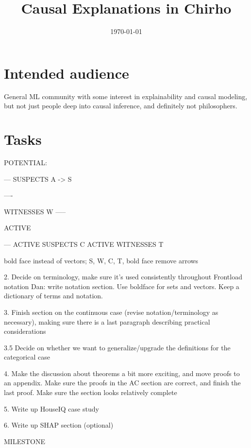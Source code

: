 \documentclass{article}
\title{Causal Explanations in Chirho}
\author{}
\date{\today}
\begin{document}
\maketitle



\section{Intended audience}

General ML community with some interest in explainability and causal modeling, but not just people deep into causal inference, and definitely not philosophers.


\section{Tasks}


POTENTIAL:

    ---
    SUSPECTS  A  -> S 
    
    ----
    
    WITNESSES  W
    -----

ACTIVE


    ---
    ACTIVE SUSPECTS    C
    ACTIVE WITNESSES    T


bold face instead of vectors; S, W, C, T, bold face
remove arrows




2. Decide on terminology, make sure it's used consistently throughout 
Frontload notation
{\color{red}Dan: write notation section. Use boldface for sets and vectors. Keep a dictionary of terms and notation.}

3. Finish section on the continuous case (revise notation/terminology as necessary), making sure there is a last paragraph describing practical considerations 

3.5 Decide on whether we want to generalize/upgrade the definitions for the categorical case

4. Make the discussion about theorems a bit more exciting, and move proofs to an appendix. Make sure the proofs in the AC section are correct, and finish the last proof. Make sure the section looks relatively complete

5. Write up HouseIQ case study

6. Write up SHAP section (optional)

MILESTONE
\end{document}
